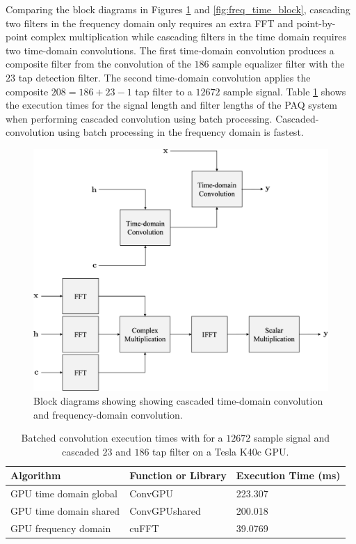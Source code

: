 Comparing the block diagrams in Figures \ref{fig:freq_time_block_cascade} and \ref{fig:freq_time_block}, cascading two filters in the frequency domain only requires an extra FFT and point-by-point complex multiplication while 
cascading filters in the time domain requires two time-domain convolutions.
The first time-domain convolution produces a composite filter from the convolution of the $186$ sample equalizer filter with the $23$ tap detection filter.
The second time-domain convolution applies the composite $208 = 186 + 23 - 1$ tap filter to a $12672$ sample signal.
Table \ref{tab:Batched_CPUvsGPUtable_12672_21_186} shows the execution times for the signal length and filter lengths of the PAQ system when performing cascaded convolution using batch processing.
Cascaded-convolution using batch processing in the frequency domain is fastest.
\begin{figure}
	\centering\includegraphics[width=10.28in/100*55]{figures/gpu_convolution/CascadeConvBlock.pdf}
	\caption{Block diagrams showing showing cascaded time-domain convolution and frequency-domain convolution.}
	\label{fig:freq_time_block_cascade}
\end{figure}
\begin{table}
\caption{Batched convolution execution times with for a $12672$ sample signal and cascaded $23$ and $186$ tap filter on a Tesla K40c GPU.}
\begin{center}
\begin{tabular}{lll}
	\toprule
	Algorithm 				& Function or Library		& Execution Time (ms) \\ \midrule
	GPU time domain global 	& ConvGPU 					& 223.307		\\
	GPU time domain shared 	& ConvGPUshared 			& 200.018		\\
	GPU frequency domain 	& cuFFT						& 39.0769		\\ 
	\bottomrule
\end{tabular}
\end{center}
\label{tab:Batched_CPUvsGPUtable_12672_21_186}
\end{table}



